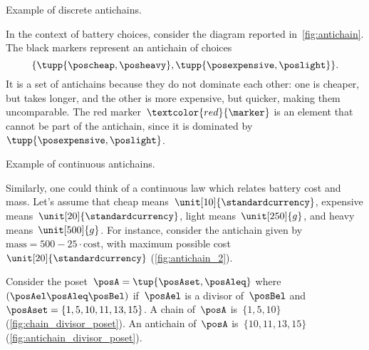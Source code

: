 \begin{marginfigure}
    \centering
    \caption{Example of discrete antichains.}
    \label{fig:antichain}
\end{marginfigure}
\begin{example}
    In the context of battery choices, consider the diagram reported in~\cref{fig:antichain}.
    The black markers represent an antichain of choices
    \begin{equation*}
        \{
        \tupp{\poscheap,\posheavy},
        \tupp{\posexpensive,\poslight}
        \}.
    \end{equation*}
    It is a set of antichains because they do not dominate each other: one is cheaper, but takes longer, and the other is more expensive, but quicker, making them uncomparable.
    The red marker~$\textcolor{red}{\marker}$ is an element that cannot be part of the antichain, since it is dominated by~$\tupp{\posexpensive,\poslight}$.

    \begin{marginfigure}
        \centering
        \caption{Example of continuous antichains.}
        \label{fig:antichain_2}
    \end{marginfigure}

    Similarly, one could think of a continuous law which relates battery cost and mass.
    Let's assume that cheap means~$\unit[10]{\standardcurrency}$, expensive means~$\unit[20]{\standardcurrency}$, light means~$\unit[250]{g}$, and heavy means~$\unit[500]{g}$.
    For instance, consider the antichain given by~$\text{mass}=500-25\cdot \text{cost}$, with maximum possible cost~$\unit[20]{\standardcurrency}$ (\cref{fig:antichain_2}).
\end{example}

\vspace{5cm}

\begin{marginfigure}
    \begin{center}
    \end{center}
    \caption{\label{fig:chain_divisor_poset}}
\end{marginfigure}

\begin{marginfigure}
    \begin{center}
    \end{center}
    \caption{\label{fig:antichain_divisor_poset}}
\end{marginfigure}

\begin{example}
    Consider the poset~$\posA=\tup{\posAset,\posAleq}$ where~$(\posAel \posAleq \posBel)$ if~$\posAel$ is a divisor of~$\posBel$ and~$\posAset=\{1,5,10,11,13,15\}$.
    A chain of~$\posA$ is~$\{1,5,10\}$ (\cref{fig:chain_divisor_poset}).
    An antichain of~$\posA$ is~$\{10,11,13,15\}$ (\cref{fig:antichain_divisor_poset}).
\end{example}
